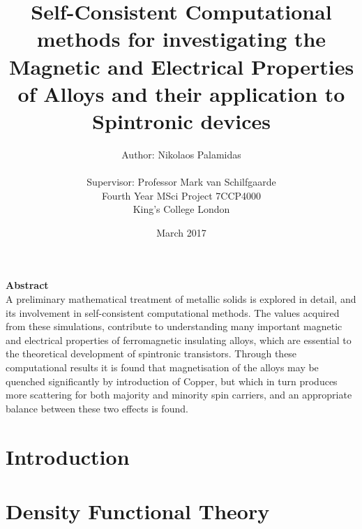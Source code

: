 \documentclass[12pt]{article}
\title{Self-Consistent Computational methods for investigating the Magnetic and Electrical Properties of Alloys and their application to Spintronic devices}
\author{Author: Nikolaos Palamidas \\\\ Supervisor: Professor Mark van Schilfgaarde\\Fourth Year MSci Project 7CCP4000 \\King's College London}
\date{March 2017}
\begin{document}
\maketitle
\clearpage
\thispagestyle{plain}
\begin{center}
    
    \vspace{0.9cm}
    \textbf{Abstract} 
   \\
   A preliminary mathematical treatment of metallic solids is explored in detail, and its involvement in self-consistent computational methods. The values acquired from these simulations, contribute to understanding many important magnetic and electrical properties of ferromagnetic insulating alloys, which are essential to the theoretical development of spintronic transistors. Through these computational results it is found that magnetisation of the alloys may be quenched significantly by introduction of Copper, but which in turn produces more scattering for both majority and minority spin carriers, and an appropriate balance between these two effects is found. 
\end{center}
\clearpage
\tableofcontents
\clearpage

\section{Introduction}







































\section{Density Functional Theory}
\end{document}

